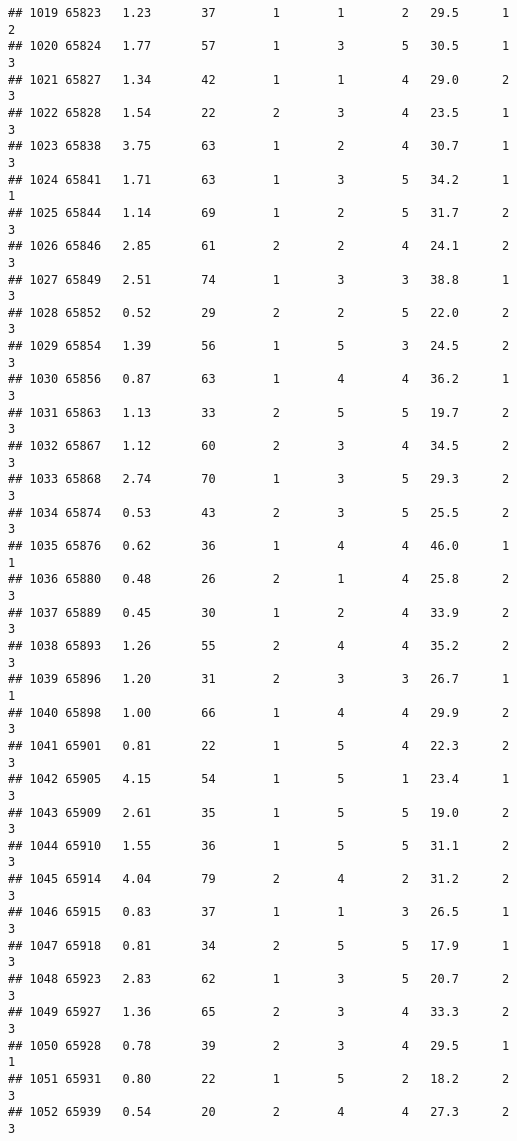 \documentclass[
]{article}
\begin{document}
\begin{verbatim}
## 1019 65823   1.23       37        1        1        2   29.5      1      2
## 1020 65824   1.77       57        1        3        5   30.5      1      3
## 1021 65827   1.34       42        1        1        4   29.0      2      3
## 1022 65828   1.54       22        2        3        4   23.5      1      3
## 1023 65838   3.75       63        1        2        4   30.7      1      3
## 1024 65841   1.71       63        1        3        5   34.2      1      1
## 1025 65844   1.14       69        1        2        5   31.7      2      3
## 1026 65846   2.85       61        2        2        4   24.1      2      3
## 1027 65849   2.51       74        1        3        3   38.8      1      3
## 1028 65852   0.52       29        2        2        5   22.0      2      3
## 1029 65854   1.39       56        1        5        3   24.5      2      3
## 1030 65856   0.87       63        1        4        4   36.2      1      3
## 1031 65863   1.13       33        2        5        5   19.7      2      3
## 1032 65867   1.12       60        2        3        4   34.5      2      3
## 1033 65868   2.74       70        1        3        5   29.3      2      3
## 1034 65874   0.53       43        2        3        5   25.5      2      3
## 1035 65876   0.62       36        1        4        4   46.0      1      1
## 1036 65880   0.48       26        2        1        4   25.8      2      3
## 1037 65889   0.45       30        1        2        4   33.9      2      3
## 1038 65893   1.26       55        2        4        4   35.2      2      3
## 1039 65896   1.20       31        2        3        3   26.7      1      1
## 1040 65898   1.00       66        1        4        4   29.9      2      3
## 1041 65901   0.81       22        1        5        4   22.3      2      3
## 1042 65905   4.15       54        1        5        1   23.4      1      3
## 1043 65909   2.61       35        1        5        5   19.0      2      3
## 1044 65910   1.55       36        1        5        5   31.1      2      3
## 1045 65914   4.04       79        2        4        2   31.2      2      3
## 1046 65915   0.83       37        1        1        3   26.5      1      3
## 1047 65918   0.81       34        2        5        5   17.9      1      3
## 1048 65923   2.83       62        1        3        5   20.7      2      3
## 1049 65927   1.36       65        2        3        4   33.3      2      3
## 1050 65928   0.78       39        2        3        4   29.5      1      1
## 1051 65931   0.80       22        1        5        2   18.2      2      3
## 1052 65939   0.54       20        2        4        4   27.3      2      3

\end{verbatim}
\end{document}
